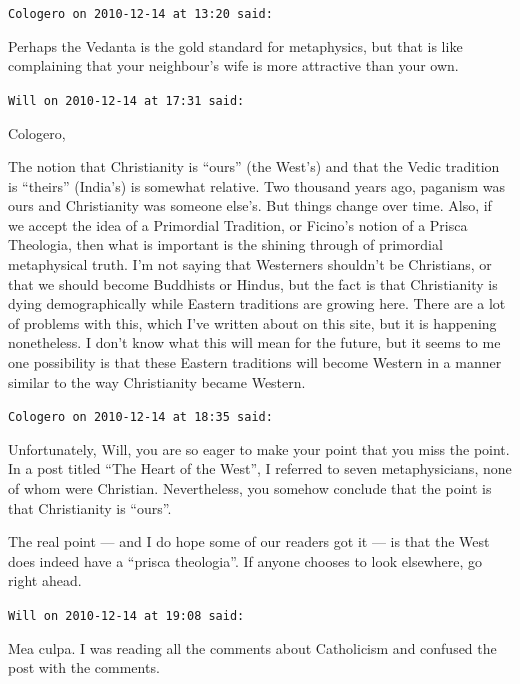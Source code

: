 \begin{footnotesize}
\begin{sffamily}
\hfill

\texttt{Cologero on 2010-12-14 at 13:20 said:}

Perhaps the Vedanta is the gold standard for metaphysics, but that is like complaining that your neighbour's wife is more attractive than your own.

\hfill

\texttt{Will on 2010-12-14 at 17:31 said:}

Cologero,

The notion that Christianity is ``ours'' (the West's) and that the Vedic tradition is ``theirs'' (India's) is somewhat relative. Two thousand years ago, paganism was ours and Christianity was someone else's. But things change over time. Also, if we accept the idea of a Primordial Tradition, or Ficino's notion of a Prisca Theologia, then what is important is the shining through of primordial metaphysical truth. I'm not saying that Westerners shouldn't be Christians, or that we should become Buddhists or Hindus, but the fact is that Christianity is dying demographically while Eastern traditions are growing here. There are a lot of problems with this, which I've written about on this site, but it is happening nonetheless. I don't know what this will mean for the future, but it seems to me one possibility is that these Eastern traditions will become Western in a manner similar to the way Christianity became Western.

\hfill

\texttt{Cologero on 2010-12-14 at 18:35 said:}

Unfortunately, Will, you are so eager to make your point that you miss the point. In a post titled ``The Heart of the West'', I referred to seven metaphysicians, none of whom were Christian. Nevertheless, you somehow conclude that the point is that Christianity is ``ours''.

The real point --- and I do hope some of our readers got it --- is that the West does indeed have a ``prisca theologia''. If anyone chooses to look elsewhere, go right ahead.

\hfill

\texttt{Will on 2010-12-14 at 19:08 said:}

Mea culpa. I was reading all the comments about Catholicism and confused the post with the comments.

\hfill

\end{sffamily}
\end{footnotesize}

